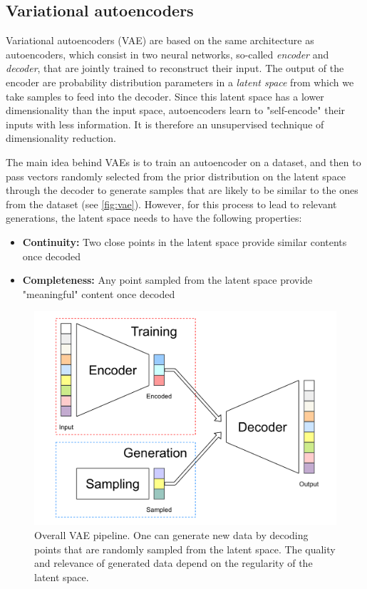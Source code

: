 \documentclass{article}
\begin{document}
\subsection{Variational autoencoders}

Variational autoencoders (VAE) are based on the same architecture as autoencoders, which consist in two neural networks, so-called \emph{encoder} and \emph{decoder}, that are jointly trained to reconstruct their input. The output of the encoder are probability distribution parameters in a \emph{latent space} from which we take samples to feed into the decoder. Since this latent space has a lower dimensionality than the input space, autoencoders learn to "self-encode" their inputs with less information. It is therefore an unsupervised technique of dimensionality reduction.

The main idea behind VAEs is to train an autoencoder on a dataset, and then to pass vectors randomly selected from the prior distribution on the latent space through the decoder to generate samples that are likely to be similar to the ones from the dataset (see \autoref{fig:vae}). However, for this process to lead to relevant generations, the latent space needs to have the following properties:
\begin{itemize}
    \item \textbf{Continuity:} Two close points in the latent space provide similar contents once decoded
    \item \textbf{Completeness:} Any point sampled from the latent space provide "meaningful" content once decoded
\end{itemize}

\begin{figure}
    \includegraphics[width=\columnwidth]{figs/VAE_diagram.pdf}
    \caption{Overall VAE pipeline. One can generate new data by decoding points that are randomly sampled from the latent space. The quality and relevance of generated data depend on the regularity of the latent space.}
    \label{fig:vae}
\end{figure}
\end{document}
